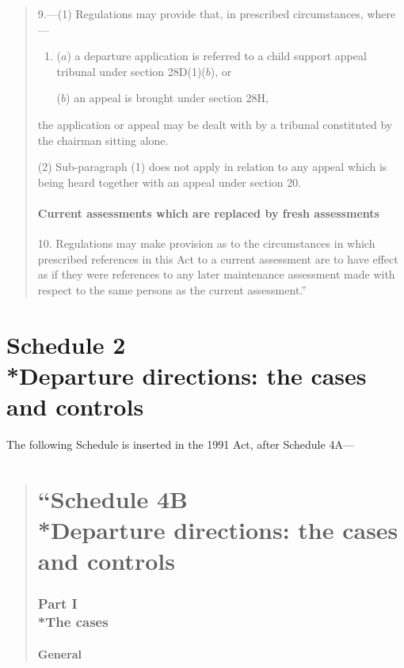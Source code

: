 \documentclass[a4paper]{article}
\newcommand{\parthead}{}
\begin{document}
{\begin{quotation}
9.---(1) Regulations may provide that, in prescribed circumstances, where—
\begin{enumerate}\item[]
($a$) a departure application is referred to a child support appeal tribunal under section 28D(1)($b$), or

($b$) an appeal is brought under section 28H,
\end{enumerate}
the application or appeal may be dealt with by a tribunal constituted by the chairman sitting alone.

(2) Sub-paragraph (1) does not apply in relation to any appeal which is being heard together with an appeal under section 20.

\subsection*{Current assessments which are replaced by fresh assessments}

10. Regulations may make provision as to the circumstances in which prescribed references in this Act to a current assessment are to have effect as if they were references to any later maintenance assessment made with respect to the same persons as the current assessment.”
\end{quotation}

\part[Schedule 2 --- Departure directions: the cases and controls]{Schedule 2\\*Departure directions: the cases and controls}

\renewcommand\parthead{--- Schedule 2}

The following Schedule is inserted in the 1991 Act, after Schedule 4A—
\begin{quotation}
\part*{“Schedule 4B\\*Departure directions: the cases and controls}

\section*{Part I\\*The cases}

\subsection*{General}


\end{quotation}}
\end{document}
